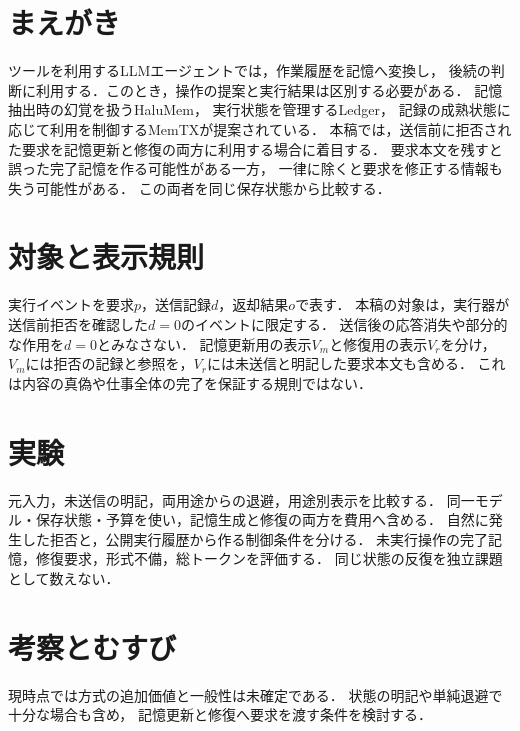 
\section{まえがき}
ツールを利用するLLMエージェントでは，作業履歴を記憶へ変換し，
後続の判断に利用する．このとき，操作の提案と実行結果は区別する必要がある．
記憶抽出時の幻覚を扱うHaluMem\cite{halumem}，
実行状態を管理するLedger\cite{ledger}，
記録の成熟状態に応じて利用を制御するMemTX\cite{memtx}が提案されている．
本稿では，送信前に拒否された要求を記憶更新と修復の両方に利用する場合に着目する．
要求本文を残すと誤った完了記憶を作る可能性がある一方，
一律に除くと要求を修正する情報も失う可能性がある．
この両者を同じ保存状態から比較する．

\section{対象と表示規則}
実行イベントを要求$p$，送信記録$d$，返却結果$o$で表す．
本稿の対象は，実行器が送信前拒否を確認した$d=0$のイベントに限定する．
送信後の応答消失や部分的な作用を$d=0$とみなさない．
記憶更新用の表示$V_m$と修復用の表示$V_r$を分け，
$V_m$には拒否の記録と参照を，$V_r$には未送信と明記した要求本文も含める．
これは内容の真偽や仕事全体の完了を保証する規則ではない．

\section{実験}
元入力，未送信の明記，両用途からの退避，用途別表示を比較する．
同一モデル・保存状態・予算を使い，記憶生成と修復の両方を費用へ含める．
自然に発生した拒否と，公開実行履歴から作る制御条件を分ける．
未実行操作の完了記憶，修復要求，形式不備，総トークンを評価する．
同じ状態の反復を独立課題として数えない．

\section{考察とむすび}
現時点では方式の追加価値と一般性は未確定である．
状態の明記や単純退避で十分な場合も含め，
記憶更新と修復へ要求を渡す条件を検討する．

